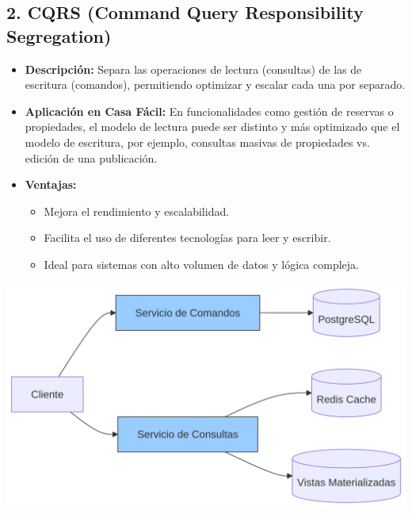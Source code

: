 	\subsection*{2. CQRS (Command Query Responsibility Segregation)}
		\begin{itemize}
			\item \textbf{Descripción:} Separa las operaciones de lectura (consultas) de las de escritura (comandos), permitiendo optimizar y escalar cada una por separado.  
			\item \textbf{Aplicación en Casa Fácil:} En funcionalidades como gestión de reservas o propiedades, el modelo de lectura puede ser distinto y más optimizado que el modelo de escritura, por ejemplo, consultas masivas de propiedades vs. edición de una publicación.  
			\item \textbf{Ventajas:}
			\begin{itemize}
				\item Mejora el rendimiento y escalabilidad.
				\item Facilita el uso de diferentes tecnologías para leer y escribir.
				\item Ideal para sistemas con alto volumen de datos y lógica compleja.
			\end{itemize}
		\end{itemize}
		\begin{center}
			\includegraphics[width=\linewidth]{figures/patterns/CQRS.png}
			\label{fig:img3}
		\end{center}
	
